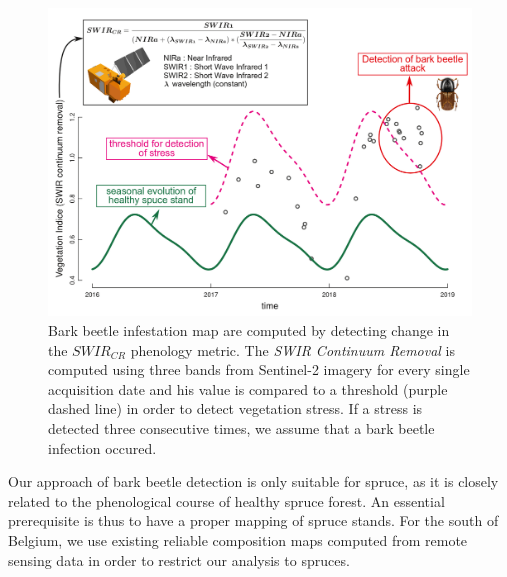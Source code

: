 \documentclass[3p,times]{elsarticle}
\begin{document}
\begin{figure}
	\centering
	\includegraphics[width=\textwidth]{fctHarmo.png}
	\caption{Bark beetle infestation map are computed by detecting change in the $SWIR_{CR}$ phenology metric. The \textit{SWIR Continuum Removal} is computed using three bands from Sentinel-2 imagery for every single acquisition date and his value is compared to a threshold (purple dashed line) in order to detect vegetation stress. If a stress is detected three consecutive times, we assume that a bark beetle infection occured.}
	\label{fig:harmo}
\end{figure}

Our approach of bark beetle detection is only suitable for spruce, as it is closely related to the phenological course of healthy spruce forest.
An essential prerequisite is thus to have a proper mapping of spruce stands.
For the south of Belgium, we use existing reliable composition maps \citep{bolyn_forest_2018} computed from remote sensing data in order to restrict our analysis to spruces.
\end{document}
